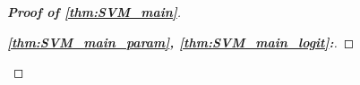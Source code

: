 \begin{proof}[\textbf{Proof of \cref{thm:SVM_main}}]
\begin{proof}[\textbf{\emph{\ref{thm:SVM_main_param}, \ref{thm:SVM_main_logit}:}}]

\end{proof}
\end{proof}
